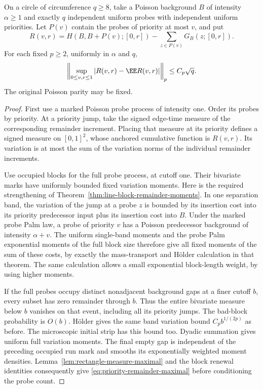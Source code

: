 \documentclass[11pt,letterpaper]{article}
\begin{document}
\begin{lemma}
\label{lem:priority-remainder-maximal}
On a circle of circumference $q\ge8$, take a Poisson
background $B$ of intensity $\alpha\ge1$ and exactly $q$
independent uniform probes with independent uniform priorities.
Let $P(v)$ contain the probes of priority at most $v$, and put
\[
 R(v,r)=H(B,B+P(v);[0,r])
                 -\sum_{z\in P(v)}G_B(z;[0,r]).
\]
For each fixed $p\ge2$, uniformly in $\alpha$ and $q$,
\begin{equation}\label{eq:priority-remainder-maximal}
 \left\|\sup_{0\le v,r\le1}
                 |R(v,r)-\EE R(v,r)|\right\|_p\le C_p\sqrt q.
\end{equation}
The original Poisson parity may be fixed.
\end{lemma}
\begin{proof}
First use a marked Poisson probe process of intensity one.
Order its probes by priority. At a priority jump, take the
signed edge-time measure of the corresponding remainder
increment. Placing that measure at its priority defines a
signed measure on $[0,1]^2$, whose anchored cumulative
function is $R(v,r)$. Its variation is at most the sum of
the variation norms of the individual remainder increments.

Use occupied blocks for the full probe process, at cutoff
one. Their bivariate marks have uniformly bounded fixed
variation moments. Here is the required strengthening of
Theorem~\ref{thm:line-block-remainder-moments}.
In one separation band, the variation of the jump at a probe
$z$ is bounded by its insertion cost into its priority
predecessor input plus its insertion cost into $B$.
Under the marked probe Palm law, a probe of priority $v$
has a Poisson predecessor background of intensity $\alpha+v$.
The uniform single-band moments and the probe Palm exponential
moments of the full block size therefore give all fixed
moments of the sum of these costs, by exactly the
mass-transport and H\"older calculation in that theorem.
The same calculation allows a small exponential block-length
weight, by using higher moments.

If the full probes occupy distinct nonadjacent background
gaps at a finer cutoff $b$, every subset has zero remainder
through $b$. Thus the entire bivariate measure below $b$
vanishes on that event, including all its priority jumps.
The bad-block probability is $O(b)$. H\"older gives the
same band variation bound $C_pb^{1/(2p)}$ as before.
The microscopic initial strip has this bound too.
Dyadic summation gives uniform full variation moments.
The final empty gap is independent of the preceding occupied
run mark and smooths its exponentially weighted moment
densities. Lemma~\ref{lem:rectangle-measure-maximal} and the
block renewal identities consequently give
\eqref{eq:priority-remainder-maximal} before conditioning
the probe count.


\end{proof}
\end{document}
